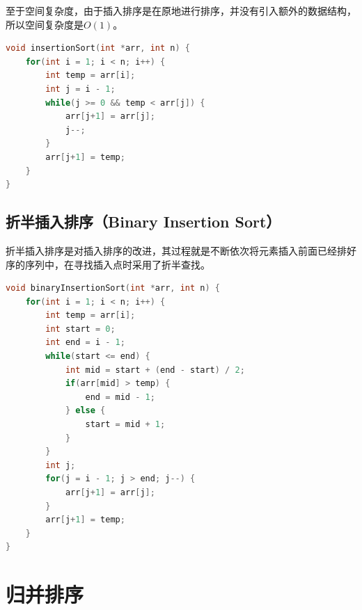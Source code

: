 至于空间复杂度，由于插入排序是在原地进行排序，并没有引入额外的数据结构，所以空间复杂度是$ O(1) $。

\begin{table}[H]
    \centering
    \caption{插入排序算法分析}
\end{table}


\begin{lstlisting}[language=C]
void insertionSort(int *arr, int n) {
    for(int i = 1; i < n; i++) {
        int temp = arr[i];
        int j = i - 1;
        while(j >= 0 && temp < arr[j]) {
            arr[j+1] = arr[j];
            j--;
        }
        arr[j+1] = temp;
    }
}
\end{lstlisting}

\subsection{折半插入排序（Binary Insertion Sort）}

折半插入排序是对插入排序的改进，其过程就是不断依次将元素插入前面已经排好序的序列中，在寻找插入点时采用了折半查找。 \\


\begin{lstlisting}[language=C]
void binaryInsertionSort(int *arr, int n) {
    for(int i = 1; i < n; i++) {
        int temp = arr[i];
        int start = 0;
        int end = i - 1;
        while(start <= end) {
            int mid = start + (end - start) / 2;
            if(arr[mid] > temp) {
                end = mid - 1;
            } else {
                start = mid + 1;
            }
        }
        int j;
        for(j = i - 1; j > end; j--) {
            arr[j+1] = arr[j];
        }
        arr[j+1] = temp;
    }
}
\end{lstlisting}

\newpage

\section{归并排序}

